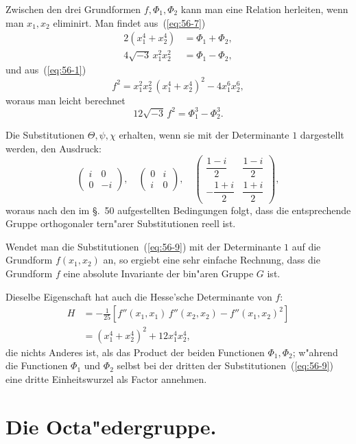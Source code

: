 \documentclass[12pt,a4paper]{article}
\theoremstyle{definition}
\begin{document}
Zwischen den drei Grundformen $f, \Phi_1, \Phi_2$ kann man eine Relation herleiten, wenn man $x_1, x_2$ eliminirt. Man findet aus~(\ref{eq:56-7})
\begin{align*}
2(x_1^4 + x_2^4) &= \Phi_1 + \Phi_2, \\
4\sqrt{-3}\,x_1^2 x_2^2 &= \Phi_1 - \Phi_2,
\end{align*}
und aus~(\ref{eq:56-1})
\[
f^2 = x_1^2 x_2^2\,(x_1^4 + x_2^4)^2 - 4x_1^6 x_2^6,
\]
woraus man leicht berechnet
\begin{equation}\label{eq:56-8}
12\sqrt{-3}\,f^2 = \Phi_1^3 - \Phi_2^3.
\end{equation}

Die Substitutionen $\Theta, \psi, \chi$ erhalten, wenn sie mit der Determinante $1$ dargestellt werden, den Ausdruck:
\begin{equation}\label{eq:56-9}
\begin{pmatrix} i & 0 \\ 0 & -i \end{pmatrix}, \quad
\begin{pmatrix} 0 & i \\ i & 0 \end{pmatrix}, \quad
\begin{pmatrix} \dfrac{1 - i}{2} & \dfrac{1 - i}{2} \\[6pt] -\dfrac{1 + i}{2} & \dfrac{1 + i}{2} \end{pmatrix},
\end{equation}
woraus nach den im \S.~50 aufgestellten Bedingungen folgt, dass die entsprechende Gruppe orthogonaler tern"arer Substitutionen reell ist.

Wendet man die Substitutionen~(\ref{eq:56-9}) mit der Determinante $1$ auf die Grundform $f(x_1, x_2)$ an, so ergiebt eine sehr einfache Rechnung, dass die Grundform $f$ eine absolute Invariante der bin"aren Gruppe $G$ ist.

Dieselbe Eigenschaft hat auch die Hesse'sche Determinante von $f$:
\begin{align*}
H &= -\frac{1}{25}\left[f''(x_1, x_1)\,f''(x_2, x_2) - f''(x_1, x_2)^2\right] \\
&= (x_1^4 + x_2^4)^2 + 12x_1^4 x_2^4,
\end{align*}
die nichts Anderes ist, als das Product der beiden Functionen $\Phi_1, \Phi_2$; w"ahrend die Functionen $\Phi_1$ und $\Phi_2$ selbst bei der dritten der Substitutionen~(\ref{eq:56-9}) eine dritte Einheitswurzel als Factor annehmen.


\section{Die Octa"edergruppe.}\label{sec:57}
\end{document}
